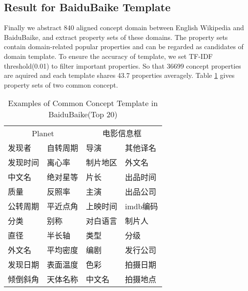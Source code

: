 \documentclass[runningheads,a4paper]{llncs}
\begin{document}
\subsection{Result for BaiduBaike Template}
Finally we abstract 840 aligned concept domain between English Wikipedia and BaiduBaike, and extract property sets of these domains. The property sets contain domain-related popular properties and can be regarded as candidates of domain template. To ensure the accuracy of template, we set TF-IDF threshold(0.01) to filter important properties. So that 36699 concept properties are aquired and each template shares 43.7 properties averagely. 
Table \ref{tab:baidu-template-examples} gives property sets of two common concept.


\begin{table}[htb]
  \centering
  \caption{Examples of Common Concept Template in BaiduBaike(Top 20)}
  \label{tab:baidu-template-examples}
    \begin{tabular}{llll}
         \multicolumn{2}{c}{Planet} & \multicolumn{2}{c}{电影信息框}\\ 
         发现者   &  自转周期  & 导演     & 其他译名 \\
         发现时间 &  离心率    & 制片地区 & 外文名   \\
         中文名   &  绝对星等  & 片长     & 出品时间 \\
         质量     &  反照率    & 主演     & 出品公司 \\
         公转周期 &  平近点角  & 上映时间 & imdb编码 \\
         分类     &  别称      & 对白语言 & 制片人   \\
         直径     &  半长轴    & 类型     & 分级     \\
         外文名   &  平均密度  & 编剧     & 发行公司 \\
         发现日期 &  表面温度  & 色彩     & 拍摄日期 \\
         倾倒斜角 &  天体名称  & 中文名   & 拍摄地点 \\
    \end{tabular}
\end{table}
\end{document}
